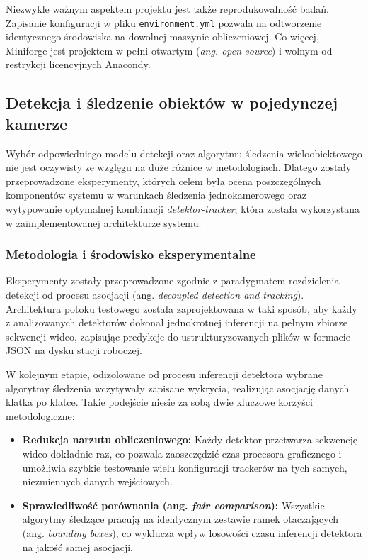 Niezwykle ważnym aspektem projektu jest także reprodukowalność badań. Zapisanie konfiguracji w
pliku \texttt{environment.yml} pozwala na odtworzenie identycznego środowiska na dowolnej maszynie
obliczeniowej. Co więcej, Miniforge jest projektem w pełni otwartym (\textit{ang. open source}) i
wolnym od restrykcji licencyjnych Anacondy.

\subsection{Detekcja i śledzenie obiektów w pojedynczej kamerze}
\label{sec:sledzenie_jednokamerowe_detekcja}

Wybór odpowiedniego modelu detekcji oraz algorytmu śledzenia wieloobiektowego nie jest oczywisty ze
wzglęgu na duże różnice w metodologiach. Dlatego zostały przeprowadzone eksperymenty, których celem
była ocena poszczególnych komponentów systemu w warunkach śledzenia jednokamerowego oraz
wytypowanie optymalnej kombinacji \textit{detektor-tracker}, która została wykorzystana w
zaimplementowanej architekturze systemu.

\subsubsection{Metodologia i środowisko eksperymentalne}
Eksperymenty zostały przeprowadzone zgodnie z paradygmatem rozdzielenia detekcji od procesu
asocjacji (ang. \textit{decoupled detection and tracking}). Architektura potoku testowego została
zaprojektowana w taki sposób, aby każdy z analizowanych detektorów dokonał jednokrotnej inferencji
na pełnym zbiorze sekwencji wideo, zapisując predykcje do ustrukturyzowanych plików w formacie JSON
na dysku stacji roboczej.

W kolejnym etapie, odizolowane od procesu inferencji detektora wybrane algorytmy śledzenia
wczytywały zapisane wykrycia, realizując asocjację danych klatka po klatce. Takie podejście niesie
za sobą dwie kluczowe korzyści metodologiczne:
\begin{itemize}
  \item \textbf{Redukcja narzutu obliczeniowego:} Każdy detektor przetwarza sekwencję wideo dokładnie raz, co pozwala zaoszczędzić czas procesora graficznego i umożliwia szybkie testowanie wielu konfiguracji trackerów na tych samych, niezmiennych danych wejściowych.
  \item \textbf{Sprawiedliwość porównania (ang. \textit{fair comparison}):} Wszystkie algorytmy śledzące pracują na identycznym zestawie ramek otaczających (ang. \textit{bounding boxes}), co wyklucza wpływ losowości czasu inferencji detektora na jakość samej asocjacji.
\end{itemize}

